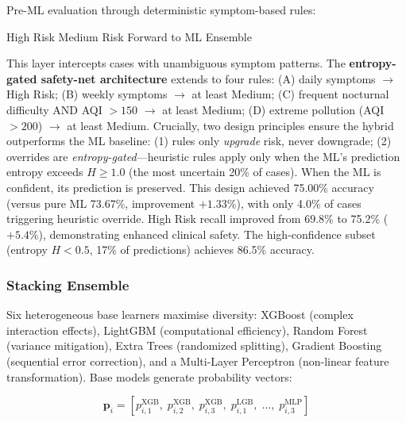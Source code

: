 \documentclass[11pt,a4paper]{article}
\begin{document}
Pre-ML evaluation through deterministic symptom-based rules:

\begin{algorithm}[H]
\caption{Clinical Heuristic Safety Layer}\label{alg:heuristic}
\begin{algorithmic}[1]
    \State \Return High Risk
    \State \Return Medium Risk
\Else
    \State Forward to ML Ensemble
\EndIf
\end{algorithmic}
\end{algorithm}

This layer intercepts cases with unambiguous symptom patterns. The
\textbf{entropy-gated safety-net architecture} extends to four rules: (A) daily symptoms
$\to$ High Risk; (B) weekly symptoms $\to$ at least Medium; (C) frequent nocturnal
difficulty AND AQI $> 150$ $\to$ at least Medium; (D) extreme pollution (AQI $> 200$)
$\to$ at least Medium. Crucially, two design principles ensure the hybrid
outperforms the ML baseline: (1) rules only \emph{upgrade} risk, never downgrade;
(2) overrides are \emph{entropy-gated}---heuristic rules apply only when the ML's
prediction entropy exceeds $H \geq 1.0$ (the most uncertain 20\% of cases). When
the ML is confident, its prediction is preserved. This design achieved 75.00\%
accuracy (versus pure ML 73.67\%, improvement $+1.33\%$), with only 4.0\% of
cases triggering heuristic override. High Risk recall improved from 69.8\% to
75.2\% ($+5.4\%$), demonstrating enhanced clinical safety. The high-confidence
subset (entropy $H < 0.5$, 17\% of predictions) achieves 86.5\% accuracy.

\subsubsection{Stacking Ensemble}

Six heterogeneous base learners maximise diversity: XGBoost \cite{chen2016} (complex
interaction effects), LightGBM \cite{ke2017} (computational efficiency), Random Forest
\cite{breiman2001} (variance mitigation), Extra Trees (randomized splitting),
Gradient Boosting (sequential error correction), and a Multi-Layer Perceptron
(non-linear feature transformation). Base models generate probability vectors:

\begin{equation}
  \mathbf{p}_i = \left[
    p_{i,1}^{\text{XGB}},\; p_{i,2}^{\text{XGB}},\; p_{i,3}^{\text{XGB}},\;
    p_{i,1}^{\text{LGB}},\; \ldots,\; p_{i,3}^{\text{MLP}}
  \right]
  \label{eq:stacking}
\end{equation}
\end{document}
